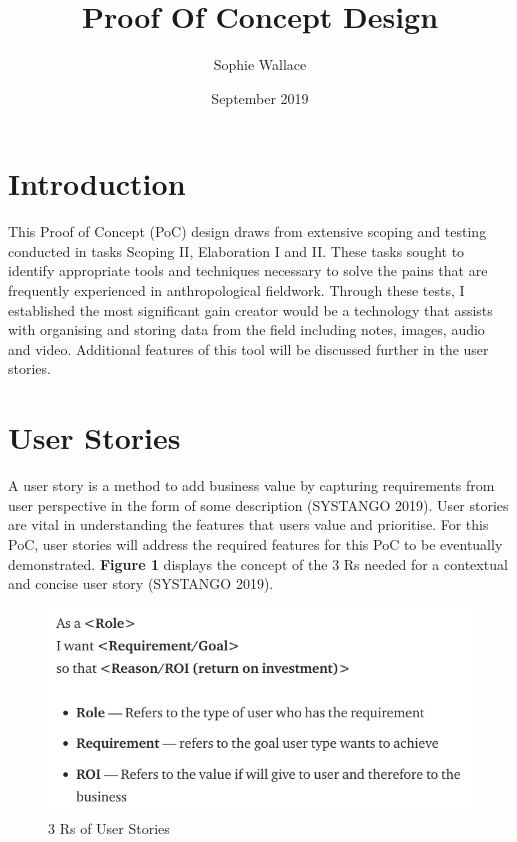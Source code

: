 \documentclass{article}
\title{Proof Of Concept Design}
\author{Sophie Wallace }
\date{September 2019}
\begin{document}
\maketitle
\tableofcontents
\clearpage

\section{Introduction}
This Proof of Concept (PoC) design draws from extensive scoping and testing conducted in tasks Scoping II, Elaboration I and II. These tasks sought to identify appropriate tools and techniques necessary to solve the pains that are frequently experienced in anthropological fieldwork. Through these tests, I established the most significant gain creator would be a technology that assists with organising and storing data from the field including notes, images, audio and video. Additional features of this tool will be discussed further in the user stories.  


\section{User Stories}
A user story is a method to add business value by capturing requirements from user perspective in the form of some description (SYSTANGO 2019). User stories are vital in understanding the features that users value and prioritise. For this PoC, user stories will address the required features for this PoC to be eventually demonstrated. \textbf{Figure 1} displays the concept of the 3 Rs needed for a contextual and concise user story (SYSTANGO 2019).

\begin{figure}[H]
    \centering
    \includegraphics[width=\textwidth, frame]{UserStories_ThreeRs.png}
    \caption{3 Rs of User Stories}
    \label{fig:my_label}
\end{figure} 
\end{document}

